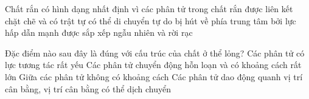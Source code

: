 

\begin{ex}
	{\color{red}\footnotesize\ttfamily [L12C1B1-TN-4]}\par %
	Chất rắn có hình dạng nhất định vì các phân tử trong chất rắn
	\choice
	{\True được liên kết chặt chẽ và có trật tự}
	{có thể di chuyển tự do}
	{bị hút về phía trung tâm bởi lực hấp dẫn mạnh}
	{được sắp xếp ngẫu nhiên và rời rạc}
\end{ex}

\begin{ex}
	{\color{red}\footnotesize\ttfamily [L12C1B1-TN-6]}\par %
	Đặc điểm nào sau đây là đúng với cấu trúc của chất ở thể lỏng?
	\choice
	{Các phân tử có lực tương tác rất yếu}
	{Các phân tử chuyển động hỗn loạn và có khoảng cách rất lớn}
	{Giữa các phân tử không có khoảng cách}
	{\True Các phân tử dao động quanh vị trí cân bằng, vị trí cân bằng có thể dịch chuyển}
\end{ex}

